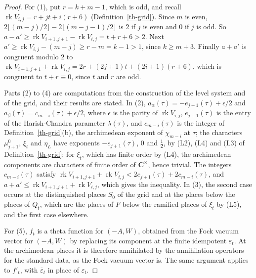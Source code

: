 \begin{proof}
For (1), put $r=k+m-1$, which is odd, and recall
$\operatorname{rk}V_{i,j}=r+jt+i(r+6)$ (Definition~\ref{th-grid}). Since $m$
is even, $2\lfloor(m-j)/2\rfloor-2\lfloor(m-j-1)/2\rfloor$ is $2$ if $j$ is
even and $0$ if $j$ is odd. So
$a-a'\geq\operatorname{rk}V_{i+1,j+1}-\operatorname{rk}V_{i,j}=t+r+6>2$.
Next $a'\geq\operatorname{rk}V_{i,j}-(m-j)\geq r-m=k-1>1$, since
$k\geq m+3$. Finally $a+a'$ is congruent modulo $2$ to
$\operatorname{rk}V_{i+1,j+1}+\operatorname{rk}V_{i,j}=2r+(2j+1)t+(2i+1)(r+6)$,
which is congruent to $t+r\equiv0$, since $t$ and $r$ are odd.

Parts (2) to (4) are computations from the construction of the level system
and of the grid, and their results are stated. In (2),
$a_\alpha(\tau)=-e_{j+1}(\tau)+\epsilon/2$ and
$a_\beta(\tau)=c_{m-i}(\tau)+\epsilon/2$, where $\epsilon$ is the parity of
$\operatorname{rk}V_{i,j}$, $e_{j+1}(\tau)$ is the entry of the
Harish-Chandra parameter $\lambda(\tau)$, and $c_{m-i}(\tau)$ is the integer
of Definition~\ref{th-grid}(b), the archimedean exponent of $\chi_{m-i}$ at
$\tau$; the
characters $\mu^0_{j+1}$, $\xi_t$ and $\eta_L$ have exponents
$-e_{j+1}(\tau)$, $0$ and $\tfrac12$, by (L2), (L4) and (L3) of
Definition~\ref{th-grid}: for $\xi_t$, which has finite order by (L4), the
archimedean components are characters of finite order of $\mathbf C^\times$,
hence trivial. The integers $c_{m-i}(\tau)$ satisfy
$\operatorname{rk}V_{i+1,j+1}+\operatorname{rk}V_{i,j}<2e_{j+1}(\tau)+2c_{m-i}(\tau)$,
and $a+a'\leq\operatorname{rk}V_{i+1,j+1}+\operatorname{rk}V_{i,j}$, which gives
the inequality. In (3), the second case occurs at the distinguished places
$S_0$ of the grid and at the places below the places of $Q_t$, which are the
places of $F$ below the ramified places of $\xi_t$ by (L5), and the first case
elsewhere.

For (5), $f_t$ is a theta function for $(-A,W)$, obtained from the Fock vacuum
vector for $(-A,W)$ by replacing its component at the finite idempotent
$\varepsilon_t$. At the archimedean places it is therefore annihilated by the
annihilation operators for the standard data, as the Fock vacuum vector is.
The same argument applies to $f'_t$, with $\bar\varepsilon_t$ in place of
$\varepsilon_t$.
\end{proof}

